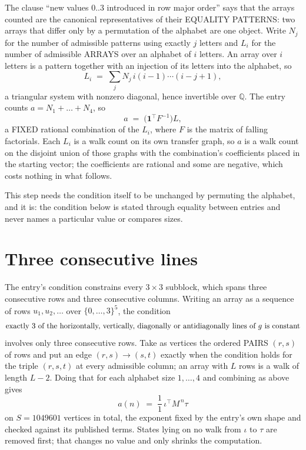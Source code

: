 \documentclass[11pt,a4paper]{article}
\theoremstyle{plain}
\theoremstyle{definition}
\begin{document}
The clause ``new values $0..3$ introduced in row major order'' says that the arrays
counted are the canonical representatives of their EQUALITY PATTERNS: two arrays that differ
only by a permutation of the alphabet are one object. Write $N_j$ for the number of admissible
patterns using exactly $j$ letters and $L_i$ for the number of admissible ARRAYS over an
alphabet of $i$ letters. An array over $i$ letters is a pattern together with an injection of
its letters into the alphabet, so
\[
L_i\;=\;\sum_{j}N_j\,i(i-1)\cdots(i-j+1),
\]
a triangular system with nonzero diagonal, hence invertible over $\mathbb{Q}$. The entry
counts $a=N_1+\dots+N_{4}$, so
\[
a\;=\;\bigl(\mathbf{1}^{\!\top}F^{-1}\bigr)L ,
\]
a FIXED rational combination of the $L_i$, where $F$ is the matrix of falling factorials.
Each $L_i$ is a walk count on its own transfer graph, so $a$ is a walk count on the disjoint
union of those graphs with the combination's coefficients placed in the starting vector; the
coefficients are rational and some are negative, which costs nothing in what follows.

This step needs the condition itself to be unchanged by permuting the alphabet, and it is:
the condition below is stated through equality between entries and never names a particular
value or compares sizes.

\section{Three consecutive lines}

The entry's condition constrains every $3\times3$ subblock, which spans three consecutive
rows and three consecutive columns. Writing an array as a sequence of rows
$u_1,u_2,\dots$ over $\{0,\dots,3\}^{5}$, the condition
\[
\text{exactly }3\text{ of the horizontally, vertically, diagonally or antidiagonally lines of }g\text{ \text{is constant}}
\]
involves only three consecutive rows. Take as vertices the ordered PAIRS $(r,s)$ of
rows and put an edge $(r,s)\to(s,t)$ exactly when the condition holds for the triple
$(r,s,t)$ at every admissible column; an array with $L$ rows is a walk of length $L-2$.
Doing that for each alphabet size $1,\dots,4$ and combining as above gives
\[
a(n)\;=\;\frac{1}{1}\,\iota^{\!\top}M^{\,n}\tau
\]
on $S=1049601$ vertices in total, the exponent fixed by the entry's own shape and checked against
its published terms. States lying on no walk from $\iota$ to $\tau$ are removed first; that
changes no value and only shrinks the computation.
\end{document}
